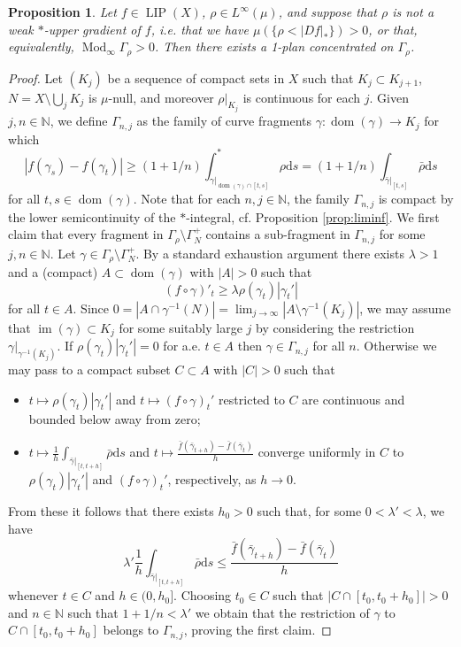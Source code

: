 \documentclass{amsart}
\newtheorem{proposition}[theorem]{Proposition}
\numberwithin{equation}{section}
\newcommand{\N}{\mathbb{N}}
\newcommand{\Mod}{\operatorname{Mod}}
\newcommand{\LIP}{\operatorname{LIP}}
\newcommand{\im}{\operatorname{im}}
\newcommand{\dom}{\operatorname{dom}}
\newcommand{\ud}{\mathrm {d}}
\newcommand{\inv}{^{-1}}
\begin{document}
\begin{proposition}\label{prop:rho-bad}
Let $f\in \LIP(X)$, $\rho\in L^\infty(\mu)$, and suppose that $\rho$ is not a weak $\ast$-upper gradient of $f$, i.e. that we have $\mu(\{\rho<|Df|_\ast\})>0$, or that, equivalently, $\Mod_\infty\Gamma_\rho>0$. Then there exists a 1-plan concentrated on $\Gamma_\rho$.

\end{proposition}

\begin{proof}

Let $(K_j)$ be a sequence of compact sets in $X$ such that $K_j\subset K_{j+1}$, $N=X\setminus \bigcup_jK_j$ is $\mu$-null, and moreover $\rho|_{K_j}$ is continuous for each $j$. Given $j,n\in\N$, we define $\Gamma_{n,j}$ as the family of curve fragments $\gamma:\dom(\gamma)\to K_j$ for which 
\[
|f(\gamma_s)-f(\gamma_t)|\ge (1+1/n)\int_{\gamma|_{\dom(\gamma)\cap [t,s]}}^*\rho\ud s=(1+1/n)\int_{\bar\gamma|_{[t,s]}}\bar \rho\ud s
\]
for all $t,s\in \dom(\gamma)$. Note that for each $n,j\in\N$, the family $\Gamma_{n,j}$ is compact by the lower semicontinuity of the $\ast$-integral, cf. Proposition \ref{prop:liminf}. We first claim that every fragment in $\Gamma_\rho\setminus \Gamma_N^+$ contains a sub-fragment in $\Gamma_{n,j}$ for some $j,n\in\N$.
Let $\gamma\in \Gamma_\rho\setminus\Gamma_N^+$. By a standard exhaustion argument there exists $\lambda>1$ and a (compact) $A\subset \dom(\gamma)$ with $|A|>0$ such that $$(f\circ\gamma)'_t\ge \lambda\rho(\gamma_t)|\gamma_t'|$$ for all $ t\in A$. Since $0=|A\cap \gamma\inv(N)|=\lim_{j\to\infty}|A\setminus \gamma\inv(K_j)|$, we may assume that $\im(\gamma)\subset K_j$ for some suitably large $j$ by considering the restriction $\gamma|_{\gamma\inv(K_j)}$. If $\rho(\gamma_t)|\gamma_t'|=0$ for a.e. $t\in A$ then $\gamma\in \Gamma_{n,j}$ for all $n$. Otherwise we may pass to a compact subset $C\subset A$ with $|C|>0$ such that
\begin{itemize}
\item $t\mapsto \rho(\gamma_t)|\gamma_t'|$ and $t\mapsto (f\circ\gamma)_t'$ restricted to $C$ are continuous and bounded below away from zero;
\item $t\mapsto \frac 1h\int_{\bar\gamma|_{[t,t+h]}}\bar\rho\ud s$  and $t \mapsto \frac{\bar f(\bar\gamma_{t+h})-\bar f(\bar\gamma_t)}{h}$ converge uniformly in $C$ to $\rho(\gamma_t)|\gamma_t'|$ and $(f\circ\gamma)_t'$, respectively, as $h\to 0$.
\end{itemize}
From these it follows that there exists $h_0>0$ such that, for some $0<\lambda'<\lambda$, we have 
\[
\lambda'\frac 1h \int_{\bar\gamma|_{[t,t+h]}}\bar\rho\ud s \le \frac{\bar f(\bar \gamma_{t+h})-\bar f(\bar \gamma_t)}{h}
\]
whenever $t\in C$ and $h\in (0,h_0]$. Choosing $t_0\in C$ such that $|C\cap [t_0,t_0+h_0]|>0$ and $n\in \N$ such that $1+1/n<\lambda'$ we obtain that the restriction of $\gamma$ to $C\cap [t_0,t_0+h_0]$ belongs to $\Gamma_{n,j}$, proving the first claim.


\end{proof}
\end{document}
